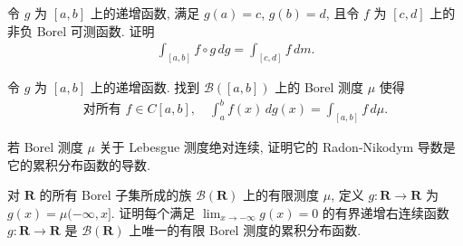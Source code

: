 \documentclass[../../main.tex]{subfiles}
\begin{document}
\begin{exercise}\label{exercise:ch20-42}
令 $g$ 为 $[a,b]$ 上的递增函数, 满足 $g(a)=c$, $g(b)=d$, 且令 $f$ 为 $[c,d]$ 上的非负 Borel 可测函数. 证明
\begin{align*}
\int_{[a,b]}f\circ g\,dg=\int_{[c,d]}f\,dm.
\end{align*}
\end{exercise}

\begin{exercise}\label{exercise:ch20-43}
令 $g$ 为 $[a,b]$ 上的递增函数. 找到 $\mathcal{B}([a,b])$ 上的 Borel 测度 $\mu$ 使得
\begin{align*}
\text{对所有 }f\in C[a,b],\quad\int_{a}^{b}f(x)\,dg(x)=\int_{[a,b]}f\,d\mu.
\end{align*}
\end{exercise}

\begin{exercise}\label{exercise:ch20-44}
若 Borel 测度 $\mu$ 关于 Lebesgue 测度绝对连续, 证明它的 Radon-Nikodym 导数是它的累积分布函数的导数.
\end{exercise}

\begin{exercise}\label{exercise:ch20-45}
对 $\mathbf{R}$ 的所有 Borel 子集所成的族 $\mathcal{B}(\mathbf{R})$ 上的有限测度 $\mu$, 定义 $g:\mathbf{R}\to\mathbf{R}$ 为 $g(x)=\mu(-\infty,x]$. 证明每个满足 $\lim_{x\to-\infty}g(x)=0$ 的有界递增右连续函数 $g:\mathbf{R}\to\mathbf{R}$ 是 $\mathcal{B}(\mathbf{R})$ 上唯一的有限 Borel 测度的累积分布函数.
\end{exercise}
\end{document}
